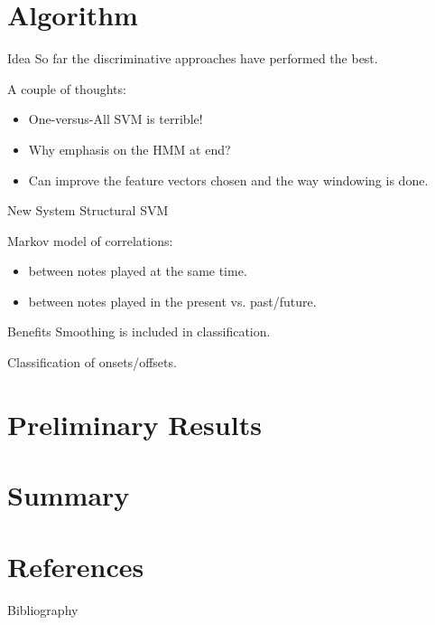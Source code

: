 \documentclass{beamer}
\begin{document}
\section{Algorithm}
\begin{frame}{Idea}
So far the discriminative approaches have performed the best.

\pause
A couple of thoughts:
\begin{itemize}
\item One-versus-All SVM is terrible!
\item Why emphasis on the HMM at end? %
\item Can improve the feature vectors chosen and the way windowing is done.
\end{itemize}
\end{frame}

\begin{frame}{New System}
Structural SVM

\vspace{1em}
Markov model of correlations:
\begin{itemize}
\item between notes played at the same time.
\item between notes played in the present vs. past/future.
\end{itemize}
\end{frame}

\begin{frame}{Benefits}
Smoothing is included in classification.

\vspace{1em}
Classification of onsets/offsets.
\end{frame}

\section{Preliminary Results}
\begin{frame}
\end{frame}

\section{Summary}
\begin{frame}
\end{frame}

\section{References}
\begin{frame}{Bibliography}

\nocite{*}

\end{frame}
\end{document}
